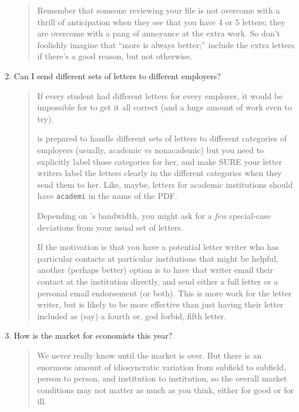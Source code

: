 \documentclass{\classes/econtex}
\begin{document}
\begin{enumerate}
\begin{quote}
      Remember that someone reviewing your file is not overcome with
      a thrill of anticipation when they see that you have 4 or 5 letters; they
      are overcome with a pang of annoyance at the extra work.  So don't foolishly
      imagine that ``more is always better;'' include the extra letters if
      there's a good reason, but not otherwise.


    \end{quote}
  \item  Can I send different sets of letters to different employers?

    \begin{quote}
      If every student had different letters for every employer, it would be impossible for {\JMStaffName} to get it all correct (and a huge amount of work even to try).

      {\JMStaffName} is prepared to handle different sets of letters to different categories of employers (usually, academic vs nonacademic) but you need to explicitly label those categories for her, and make SURE your letter writers label the letters clearly in the different categories when they send them to her.  Like, maybe, letters for academic institutions should have \texttt{academi} in the name of the PDF.

      Depending on {\JMStaffName}'s bandwidth, you might ask for a \textit{few} special-case deviations from your usual set of letters.

      If the motivation is that you have a potential letter writer who has particular contacts at particular institutions that might be helpful, another (perhaps better) option is to have that writer email their contact at the institution directly, and send either a full letter or a personal email endorsement (or both).  This is more work for the letter writer, but is likely to be more effective than just having their letter included as (say) a fourth or, god forbid, fifth letter.

    \end{quote}
  \item  How is the market for economists this year?

    \begin{quote}
      We never really know until the market is over.  But there is an enormous amount of idiosyncratic
      variation from subfield to subfield, person to person, and institution to
      institution, so the overall market conditions may not matter as much
      as you think, either for good or for ill.


\end{quote}
\end{enumerate}
\end{document}
